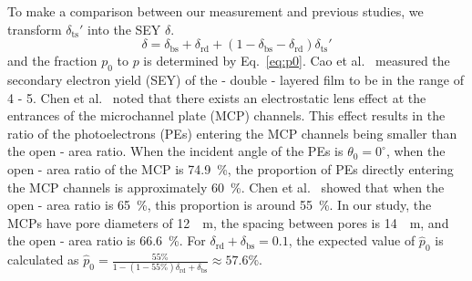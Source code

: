 To make a comparison between our measurement and previous studies, we transform \(\delta_\text{ts}'\) into the SEY \(\delta\).
\begin{equation}
	\label{eq:2}
	\delta = \delta_\text{bs} + \delta_\text{rd} + (1-\delta_\text{bs} - \delta_\text{rd}) \delta_\text{ts}'
\end{equation}
and the fraction \(p_0\) to \(p\) is determined by Eq.~\eqref{eq:p0}. Cao et al.~\cite{cao_secondary_2021} measured the secondary electron yield (SEY) of the - double - layered film to be in the range of 4 - 5. Chen et al.~\cite{2016Optimization} noted that there exists an electrostatic lens effect at the entrances of the microchannel plate (MCP) channels. This effect results in the ratio of the photoelectrons (PEs) entering the MCP channels being smaller than the open - area ratio. When the incident angle of the PEs is \(\theta_0 = 0^\circ\), when the open - area ratio of the MCP is \SI{74.9}{\percent}, the proportion of PEs directly entering the MCP channels is approximately \SI{60}{\percent}. Chen et al.~\cite{chen2018photoelectron} showed that when the open - area ratio is \SI{65}{\percent}, this proportion is around \SI{55}{\percent}. In our study, the MCPs have pore diameters of \SI{12}{\mu\meter}, the spacing between pores is \SI{14} {\mu\meter}, and the open - area ratio is \SI{66.6}{\percent}. For \(\delta_{\mathrm{rd}}+\delta_{\mathrm{bs}} = 0.1\), the expected value of \(\hat{p}_0\) is calculated as \(\hat{p}_0=\frac{55\%}{1-(1 - 55\%)\delta_{\mathrm{rd}}+\delta_{\mathrm{bs}}}\approx 57.6\%\).
